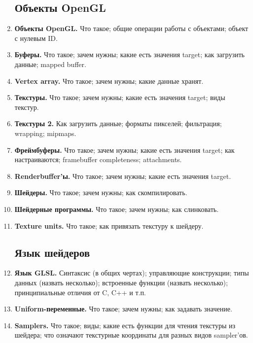 \documentclass{article}
\begin{document}
\begin{enumerate}
\subsection{Объекты OpenGL}
\item \textbf{Объекты OpenGL.} Что такое; общие операции работы с объектами; объект с нулевым ID.
\item \textbf{Буферы.} Что такое; зачем нужны; какие есть значения target; как загрузить данные; mapped buffer.
\item \textbf{Vertex array.} Что такое; зачем нужны; какие данные хранят.
\item \textbf{Текстуры.} Что такое; зачем нужны; какие есть значения target; виды текстур.
\item \textbf{Текстуры 2.} Как загрузить данные; форматы пикселей; фильтрация; wrapping; mipmaps.
\item \textbf{Фреймбуферы.} Что такое; зачем нужны; какие есть значения target; как настраиваются; framebuffer completeness; attachments.
\item \textbf{Renderbuffer'ы.} Что такое; зачем нужны; какие есть значения target.
\item \textbf{Шейдеры.} Что такое; зачем нужны; как скомпилировать.
\item \textbf{Шейдерные программы.} Что такое; зачем нужны; как слинковать.
\item \textbf{Texture units.} Что такое; как привязать текстуру к шейдеру.

\subsection{Язык шейдеров}
\item \textbf{Язык GLSL.} Синтаксис (в общих чертах); управляющие конструкции; типы данных (назвать несколько); встроенные функции (назвать несколько); принципиальные отличия от C, C++ и т.п.
\item \textbf{Uniform-переменные.} Что такое; зачем нужны; как задавать значение.
\item \textbf{Samplers.} Что такое; виды; какие есть функции для чтения текстуры из шейдера; что означают текстурные координаты для разных видов sampler'ов.


\end{enumerate}
\end{document}
